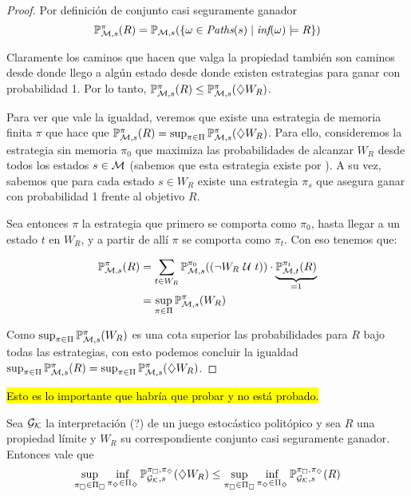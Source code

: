 \begin{proof}
	Por definición de conjunto casi seguramente ganador
	$$
		\mathbb{P}_{\mathcal{M},s}^\pi (R) = \mathbb{P}_{\mathcal{M},s}(\{ \omega \in \textit{Paths}(s) \mid \textit{inf}(\omega) \models R\})
	$$

	Claramente los caminos que hacen que valga la propiedad también son caminos
	desde donde llego a algún estado desde donde existen estrategias para ganar con
	probabilidad 1. Por lo tanto, $\mathbb{P}_{\mathcal{M}, s}^\pi (R) \leq \mathbb{P}_{\mathcal{M}, s}^\pi (\diamondsuit W_R)$.

	Para ver que vale la igualdad, veremos que existe una estrategia de memoria
	finita $\pi$ que hace que $\mathbb{P}_{\mathcal{M}, s}^\pi (R) = \sup_{\pi \in \Pi} \mathbb{P}_{\mathcal{M}, s}^\pi (\diamondsuit
		W_R) $. Para ello, consideremos la estrategia sin memoria $\pi_0$ que maximiza
	las probabilidades de alcanzar $W_R$ desde todos los estados $s \in \mathcal{M}$
	(sabemos que esta estrategia existe por \cite{Polytopal, CONDON1992}). A su
	vez, sabemos que para cada estado $s \in W_R$ existe una estrategia $\pi_s$ que
	asegura ganar con probabilidad 1 frente al objetivo $R$.

	Sea entonces $\pi$ la estrategia que primero se comporta como $\pi_0$, hasta
	llegar a un estado $t$ en $W_R$, y a partir de allí $\pi$ se comporta como
	$\pi_t$. Con eso tenemos que:

	\begin{align*}
		\mathbb{P}_{\mathcal{M}, s}^\pi (R) &= \sum_{t \in W_R} \mathbb{P}_{\mathcal{M},s}^{\pi_0} ((\neg W_R \ \mathcal{U} \  t)) \cdot \underbrace{\mathbb{P}_{\mathcal{M},t}^{\pi_t}(R)}_{=1} \\
		&= \sup_{\pi \in \Pi} \mathbb{P}_{\mathcal{M}, s}^\pi (W_R)
	\end{align*}

	Como $\sup_{\pi \in \Pi} \mathbb{P}_{\mathcal{M}, s}^\pi (W_R)$ es una cota superior las
	probabilidades para $R$ bajo todas las estrategias, con esto podemos concluir
	la igualdad $\sup_{\pi \in \Pi} \mathbb{P}_{\mathcal{M}, s}^\pi (R) = \sup_{\pi \in \Pi} \mathbb{P}_{\mathcal{M}, s}^\pi
		(\diamondsuit W_R)$.
\end{proof}

\hl{Esto es lo importante que habría que probar y no está probado.}

\begin{lemma}
	\label{**2}
	Sea $\mathcal{G}_{\mathcal{K}}$ la interpretación (?) de un juego estocástico politópico y sea $R$ una propiedad límite y $W_R$ su correspondiente conjunto casi seguramente ganador. Entonces vale que
	$$
		\sup_{\pi_\square \in \Pi_\square} \inf_{\pi_\diamondsuit \in \Pi_\diamondsuit} \mathbb{P}_{\mathcal{G}_{\mathcal{K}}, s}^{\pi_\square, \pi_\diamondsuit} (\diamondsuit W_R) \leq \sup_{\pi_\square \in \Pi_\square} \inf_{\pi_\diamondsuit \in \Pi_\diamondsuit}  \mathbb{P}_{\mathcal{G}_{\mathcal{K}}, s}^{\pi_\square, \pi_\diamondsuit} (R)
	$$
\end{lemma}

